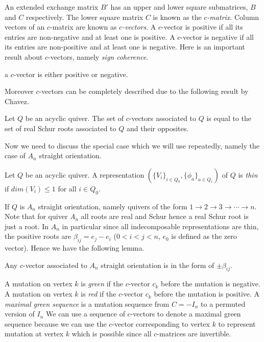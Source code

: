 \indent An extended exchange matrix $B'$ has an upper and lower square submatrices, $B$ and $C$ respectively. The lower square matrix $C$ is known as the $c$\textit{-matrix}. Column vectors of an $c$-matrix are known as $c$\textit{-vectors}. A $c$-vector is positive if all its entries are non-negative and at least one is positive. A $c$-vector is negative if all its entries are non-positive and at least one is negative. Here is an important result about $c$-vectors, namely \textit{sign coherence}.\\
\begin{theorem}
\cite{GHKK14} a $c$-vector is either positive or negative.
\end{theorem}
\indent Moreover $c$-vectors can be completely described due to the following result by Chavez\cite{C15}.\\
\begin{theorem} \label{CV}
Let $Q$ be an acyclic quiver. The set of $c$-vectors associated to $Q$ is equal to the set of real Schur roots associated to $Q$ and their opposites.
\end{theorem}
\indent Now we need to discuss the special case which we will use repeatedly, namely the case of $A_n$ straight orientation.\\
\begin{definition}
Let $Q$ be an acyclic quiver. A representation $(\{V_i\}_{i\in Q_0}, \{\phi_a\}_{a\in Q_1})$ of $Q$ is \textit{thin} if $dim(V_i) \leq 1$ for all $i\in Q_0$.
\end{definition}
\indent If $Q$ is $A_n$ straight orientation, namely quivers of the form $1\to 2\to 3\to\cdots\to n$. Note that for quiver $A_n$ all roots are real and Schur hence a real Schur root is just a root. In $A_n$ in particular since all indecomposable representations are thin, the positive roots are $\beta_{ij}=e_j-e_i$ ($0<i<j<n$, $e_0$ is defined as the zero vector). Hence we have the following lemma.\\
\begin{lemma} \label{CVA}
Any $c$-vector associated to $A_n$ straight orientation is in the form of $\pm\beta_{ij}$.
\end{lemma}
\indent A mutation on vertex $k$ is \textit{green} if the $c$-vector $c_k$ before the mutation is negative.  A mutation on vertex $k$ is \textit{red} if the $c$-vector $c_k$ before the mutation is positive. A \textit{maximal green sequence} is a mutation sequence from $C=-I_n$ to a permuted version of $I_n$ We can use a sequence of $c$-vectors to denote a maximal green sequence because we can use the $c$-vector corresponding to vertex $k$ to represent mutation at vertex $k$ which is possible since all $c$-matrices are invertible.\\
